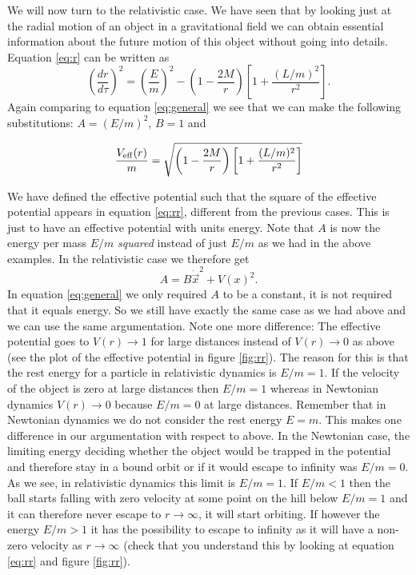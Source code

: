 {\begin{multicols}{2}
We will now turn to the relativistic case. We have seen that by looking just at the radial motion of an object in a gravitational field we can obtain essential information about the future motion of this object without going into details. Equation \ref{eq:r} can be written as
\begin{equation}
\label{eq:rr}
\left(\frac{dr}{d\tau}\right)^2=\left(\frac{E}{m}\right)^2-\left(1-\frac{2M}{r}\right)\left[1+\frac{(L/m)^2}{r^2}\right].
\end{equation}
Again comparing to equation \ref{eq:general} we see that we can make the following substitutions: $A=(E/m)^2$, $B=1$ and
\begin{formbox}
\[
\frac{V_{\rm eff}(r)}{m}=\sqrt{\left(1-\frac{2M}{r}\right)\left[1+\frac{(L/m)^2}{r^2}\right]}
\]
\end{formbox}
We have defined the effective potential such that the square of the effective potential appears in equation \ref{eq:rr}, different from the previous cases. This is just to have an effective potential with units energy. Note that $A$ is now the energy per mass $E/m$ {\it squared} instead of just $E/m$ as we had in the above examples. In the relativistic case we therefore get 
\begin{equation}\label{eq:relativistic_motion}
A=B\dot{\vec{x}}^2+V(x)^2.
\end{equation}
In equation \ref{eq:general} we only required $A$ to be a constant, it is not required that it equals energy. So we still have exactly the same case as we had above and we can use the same argumentation. Note one more difference: The effective potential goes to $V(r)\rightarrow1$ for large distances instead of $V(r)\rightarrow0$ as above (see the plot of the effective potential in figure \ref{fig:rr}). The reason for this is that the rest energy for a particle in relativistic dynamics is $E/m=1$. If the velocity of the object is zero at large distances then $E/m=1$ whereas in Newtonian dynamics $V(r)\rightarrow0$ because $E/m=0$ at large distances. Remember that in Newtonian dynamics we do not consider the rest energy $E=m$. This makes one difference in our argumentation with respect to above. In the Newtonian case, the limiting energy deciding whether the object would be trapped in the potential and therefore stay in a bound orbit or if it would escape to infinity was $E/m=0$. As we see, in relativistic dynamics this limit is $E/m=1$. If $E/m<1$ then the ball starts falling with zero velocity at some point on the hill below $E/m=1$ and it can therefore never escape to $r\rightarrow\infty$, it will start orbiting. If however the energy $E/m>1$ it has the possibility to escape to infinity as it will have a non-zero velocity as $r\rightarrow\infty$ (check that you understand this by looking at equation \ref{eq:rr} and figure \ref{fig:rr}).



\end{multicols}}
